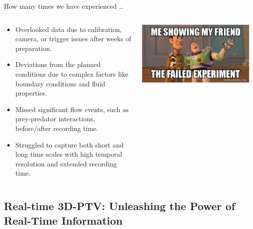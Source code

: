 \begin{frame}[label=why-3a]{How many times we have experienced \ldots }
\begin{columns}

\begin{cardTiny}
\begin{itemize}
\item Overlooked data due to calibration, camera, or trigger issues after weeks of preparation.
\item Deviations from the planned conditions due to complex factors like boundary conditions and fluid properties.
\item Missed significant flow events, such as prey-predator interactions, before/after recording time.
\item Struggled to capture both short and long time scales with high temporal resolution and extended recording time.
\end{itemize}
\end{cardTiny}
\includegraphics[width=\textwidth]{fig/me-showing.jpg}
\end{columns}
\end{frame}

\subsection{Real-time 3D-PTV: Unleashing the Power of Real-Time Information}

